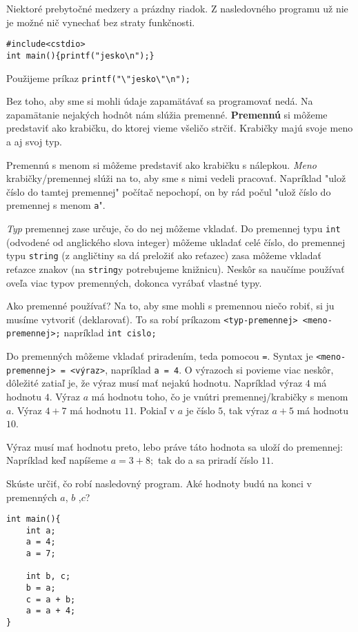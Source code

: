 \riesenie Niektoré prebytočné medzery a prázdny riadok. Z nasledovného
programu už nie je možné nič vynechať bez straty funkčnosti.
\begin{lstlisting}
#include<cstdio>
int main(){printf("jesko\n");}
\end{lstlisting}

\riesenie Použijeme príkaz \verb!printf("\"jesko\"\n");!

Bez toho, aby sme si mohli údaje zapamätávať sa programovať nedá. Na zapamätanie
nejakých hodnôt nám slúžia premenné. \textbf{Premennú} si môžeme predstaviť ako
krabičku, do ktorej vieme všeličo strčiť. Krabičky majú svoje meno a aj svoj
typ. 

Premennú s menom si môžeme predstaviť ako krabičku s nálepkou.
\emph{Meno} krabičky/premennej slúži na to, aby sme s nimi vedeli pracovať.
Napríklad "ulož číslo do tamtej premennej" počítač nepochopí, on by rád počul
"ulož číslo do premennej s menom \verb'a'". 

\emph{Typ} premennej zase určuje, čo do nej môžeme vkladať. Do premennej typu
\verb!int! (odvodené od anglického slova integer) môžeme ukladať celé číslo, do
premennej typu \verb!string! (z angličtiny sa dá preložiť ako reťazec) zasa môžeme vkladať reťazce
znakov (na \verb!string!y potrebujeme knižnicu). Neskôr sa naučíme používať
oveľa viac typov premenných, dokonca vyrábať vlastné typy.

\medskip

Ako premenné používať? Na to, aby sme mohli s premennou niečo robiť, si
ju musíme vytvoriť (deklarovať). To sa robí príkazom \verb!<typ-premennej> <meno-premennej>;!
napríklad \verb!int cislo;! 

Do premenných môžeme vkladať priradením, teda pomocou \verb'='. Syntax je
\verb!<meno-premennej> = <výraz>!, napríklad \verb!a = 4!. O výrazoch si
povieme viac neskôr, dôležité zatiaľ je, že výraz musí mať nejakú hodnotu.
Napríklad výraz $4$ má hodnotu $4$. Výraz $a$ má hodnotu toho, čo je vnútri
premennej/krabičky s menom $a$.  Výraz $4 + 7$ má hodnotu $11$. Pokiaľ v $a$ je
číslo $5$, tak výraz $a + 5$ má hodnotu $10$.

Výraz musí mať hodnotu preto, lebo práve táto hodnota sa uloží do premennej:
Napríklad keď napíšeme $a = 3 + 8;$ tak do a sa priradí číslo $11$.

\cvicenie Skúste určiť, čo robí nasledovný program. Aké hodnoty budú na
konci v premenných $a$, $b$ ,$c$?
\begin{lstlisting}
int main(){
    int a;
    a = 4;
    a = 7;

    int b, c;
    b = a;
    c = a + b;
    a = a + 4;
}
\end{lstlisting}

